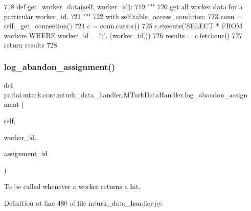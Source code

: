 \begin{DoxyCode}
718     \textcolor{keyword}{def }get\_worker\_data(self, worker\_id):
719         \textcolor{stringliteral}{"""}
720 \textcolor{stringliteral}{        get all worker data for a particular worker\_id.}
721 \textcolor{stringliteral}{        """}
722         with self.table\_access\_condition:
723             conn = self.\_get\_connection()
724             c = conn.cursor()
725             c.execute(\textcolor{stringliteral}{'SELECT * FROM workers WHERE worker\_id = ?;'}, (worker\_id,))
726             results = c.fetchone()
727             \textcolor{keywordflow}{return} results
728 
\end{DoxyCode}
\mbox{\label{classparlai_1_1mturk_1_1core_1_1mturk__data__handler_1_1MTurkDataHandler_ab4a4d10fa1923efc5dfdcf2e451c816f}} 
\subsubsection{\texorpdfstring{log\+\_\+abandon\+\_\+assignment()}{log\_abandon\_assignment()}}
{\footnotesize\ttfamily def parlai.\+mturk.\+core.\+mturk\+\_\+data\+\_\+handler.\+M\+Turk\+Data\+Handler.\+log\+\_\+abandon\+\_\+assignment (\begin{DoxyParamCaption}\item[{}]{self,  }\item[{}]{worker\+\_\+id,  }\item[{}]{assignment\+\_\+id }\end{DoxyParamCaption})}

\begin{DoxyVerb}To be called whenever a worker returns a hit.
\end{DoxyVerb}
 

Definition at line 480 of file mturk\+\_\+data\+\_\+handler.\+py.


